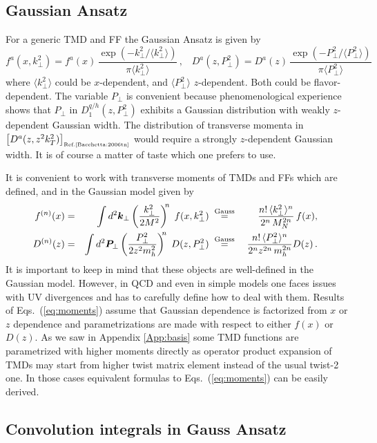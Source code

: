\documentclass[a4paper,11pt]{article}
\newcommand{\be}{\begin{equation}}
\newcommand{\ee}{\end{equation}}
\newcommand{\la}{\langle}
\newcommand{\ra}{\rangle}
\def\bfkperp{{\bm k}_\perp}
\def\bfpperp{{\bm P}_\perp}
\def\kperp{k_\perp}
\def\pperp{P_\perp}
\begin{document}
\subsection{Gaussian Ansatz}

For a generic TMD and FF the Gaussian Ansatz is given by 
\be
    f^a(x,\kperp^2)=
    f^a(x)\,\frac{\exp(-\kperp^2/\la\kperp^2\ra)}{\pi\la\kperp^2\ra}\,,\;\;\;
    D^a(z,\pperp^2)=
    D^a(z)\,\frac{\exp(-\pperp^2/\la\pperp^2\ra)}{\pi\la\pperp^2\ra}
\ee
where 
$\la\kperp^2\ra$ could be $x$-dependent,  
and $\la\pperp^2\ra$ $z$-dependent. 
Both could be flavor-dependent.
The variable $\pperp$ is convenient because phenomenological experience 
shows that $\pperp$ in $D_1^{q/h}(z,\pperp^2)$ exhibits a Gaussian distribution 
with weakly $z$-dependent Gaussian width. The distribution of transverse 
momenta in $\left[D^a(z,z^2 k_T^2)\right]_{\mbox{\tiny Ref.\cite{Bacchetta:2006tn}}}$ 
would require a strongly $z$-dependent Gaussian width. It is of course 
a matter of taste which one prefers to use.

It is convenient to work with transverse moments of TMDs and FFs
which are defined, and in the Gaussian model given by
\begin{alignat}{6}
	f^{(n)}(x) &=& \int d^2\bfkperp
	\left(\frac{\kperp^2}{2M^2}\right)^{\!\!n}\; f(x, \kperp^2)
	\;&\stackrel{\rm Gauss}{=}&\;
	\frac{n!\,\la \kperp^2\ra^n}{ 2^n\,M_N^{2n}}\, f(x),\;\;\;\nonumber\\
	D^{(n)}(z) &=& \int d^2\bfpperp
	\left(\frac{\pperp^2}{2 z^2 m_h^2}\right)^{\!\!n}\; D(z, \pperp^2)
	\;&\stackrel{\rm Gauss}{=}&\;
	\frac{n!\,\la \pperp^2\ra^n}{ 2^n_{ }z^{2n}_{ }\,m_{h}^{2n}} D(z)\,. \;\;\;
	\label{eq:moments}
\end{alignat}
It is important to keep in mind that these objects are well-defined
in the Gaussian model. However, in QCD and even in simple models
\cite{Avakian:2010br,Schweitzer:2012hh} one faces issues with UV 
divergences and has to carefully define how to deal with them. Results of Eqs.~(\ref{eq:moments}) assume that Gaussian dependence is factorized from $x$ or $z$ dependence and parametrizations are made with respect to either $f(x)$ or $D(z)$. As we saw in Appendix \ref{App:basis} some TMD functions are parametrized with higher moments directly as operator product expansion of TMDs may start from higher twist matrix element instead of the usual twist-2 one. In those cases equivalent formulas to Eqs.~(\ref{eq:moments}) can be easily derived.


\subsection{Convolution integrals in Gauss Ansatz}
\label{App:convol-details}
\end{document}

